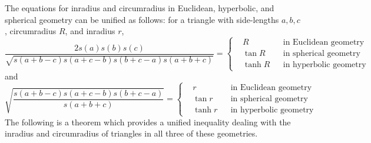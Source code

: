 \documentclass[12pt,notitlepage]{amsart}%
\begin{document}
The equations for inradius and circumradius in Euclidean, hyperbolic, and spherical geometry can be unified as follows: for a triangle with side-lengths $a,b,c$, circumradius $R$, and inradius $r$, 
\begin{equation*}
\frac{2s(a)s(b)s(c)}{\sqrt{s(a+b-c)s(a+c-b)s(b+c-a)s(a+b+c)}}=\left\{
\begin{aligned}
&R   &&\text{in Euclidean geometry}\\
&\tan{R}   &&\text{in spherical geometry}\\
&\tanh{R}   &&\text{in hyperbolic geometry}
\end{aligned}
\right.
\end{equation*}
and
\begin{equation*}
\sqrt{\frac{s(a+b-c)s(a+c-b)s(b+c-a)}{s(a+b+c)}}=\left\{
\begin{aligned}
&r   &&\text{in Euclidean geometry}\\
&\tan{r}   &&\text{in spherical geometry}\\
&\tanh{r}   &&\text{in hyperbolic geometry}
\end{aligned}
\right.
\end{equation*}
The following is a theorem which provides a unified inequality dealing with the inradius and circumradius of triangles in all three of these geometries.
\end{document}
